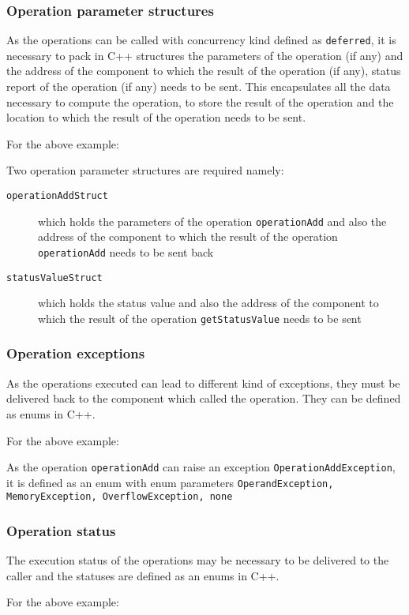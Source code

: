 \subsubsection{Operation parameter structures}
As the operations can be called with concurrency kind defined as \texttt{deferred}, it is necessary to pack in C++ structures the parameters of the operation (if any) and the address of the component to which the result of the operation (if any), status report of the operation (if any) needs to be sent. This encapsulates all the data necessary to compute the operation, to store the result of the operation and the location to which the result of the operation needs to be sent.  

For the above example:

Two operation parameter structures are required namely:
\begin{description}
\item [\texttt{operationAddStruct}] which holds the parameters of the operation \texttt{operationAdd} and also the address of the component to which the result of the operation \texttt{operationAdd} needs to be sent back
\item [\texttt{statusValueStruct}] which holds the status value and also the address of the component to which the result of the operation \texttt{getStatusValue} needs to be sent
\end{description}

\subsubsection{Operation exceptions}
As the operations executed can lead to different kind of exceptions, they must be delivered back to the component which called the operation. They can be defined as enums in C++.

For the above example:

As the operation \texttt{operationAdd} can raise an exception \texttt{OperationAddException}, it is defined as an enum with enum parameters \texttt{OperandException, MemoryException, OverflowException, none}

\subsubsection{Operation status}
The execution status of the operations may be necessary to be delivered to the caller and the statuses are defined as an enums in C++.

For the above example:

